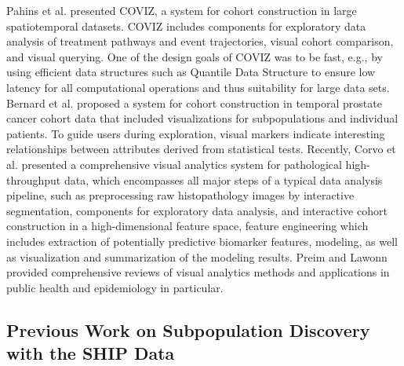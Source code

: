 \documentclass[
  oneside]{book}
\begin{document}
Pahins et al. \autocite{Pahins:COVIZ2019} presented COVIZ, a system for cohort construction in large spatiotemporal datasets.
COVIZ includes components for exploratory data analysis of treatment pathways and event trajectories, visual cohort comparison, and visual querying.
One of the design goals of COVIZ was to be fast, e.g., by using efficient data structures such as Quantile Data Structure \autocite{de2019real} to ensure low latency for all computational operations and thus suitability for large data sets.
Bernard et al. \autocite{bernard2015visual} proposed a system for cohort construction in temporal prostate cancer cohort data that included visualizations for subpopulations and individual patients.
To guide users during exploration, visual markers indicate interesting relationships between attributes derived from statistical tests.
Recently, Corvo et al. \autocite{Corvo2020} presented a comprehensive visual analytics system for pathological high-throughput data, which encompasses all major steps of a typical data analysis pipeline, such as preprocessing raw histopathology images by interactive segmentation, components for exploratory data analysis, and interactive cohort construction in a high-dimensional feature space, feature engineering which includes extraction of potentially predictive biomarker features, modeling, as well as visualization and summarization of the modeling results.
Preim and Lawonn provided comprehensive reviews of visual analytics methods and applications in public health \autocite{preim2020survey} and epidemiology \autocite{Preim16} in particular.

\hypertarget{previous-work-on-subpopulation-discovery-with-the-ship-data}{%
\subsection{Previous Work on Subpopulation Discovery with the SHIP Data}\label{previous-work-on-subpopulation-discovery-with-the-ship-data}}
\end{document}
